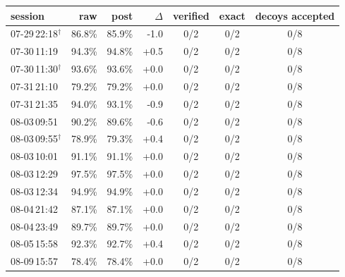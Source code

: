 \begin{tabular}{@{}lrrrccc@{}}
\toprule
session & raw & post & $\Delta$ & verified & exact & decoys accepted \\
\midrule
07-29\,22:18$^{\dagger}$ & 86.8\% & 85.9\% & -1.0 & 0/2 & 0/2 & 0/8 \\
07-30\,11:19 & 94.3\% & 94.8\% & +0.5 & 0/2 & 0/2 & 0/8 \\
07-30\,11:30$^{\dagger}$ & 93.6\% & 93.6\% & +0.0 & 0/2 & 0/2 & 0/8 \\
07-31\,21:10 & 79.2\% & 79.2\% & +0.0 & 0/2 & 0/2 & 0/8 \\
07-31\,21:35 & 94.0\% & 93.1\% & -0.9 & 0/2 & 0/2 & 0/8 \\
08-03\,09:51 & 90.2\% & 89.6\% & -0.6 & 0/2 & 0/2 & 0/8 \\
08-03\,09:55$^{\dagger}$ & 78.9\% & 79.3\% & +0.4 & 0/2 & 0/2 & 0/8 \\
08-03\,10:01 & 91.1\% & 91.1\% & +0.0 & 0/2 & 0/2 & 0/8 \\
08-03\,12:29 & 97.5\% & 97.5\% & +0.0 & 0/2 & 0/2 & 0/8 \\
08-03\,12:34 & 94.9\% & 94.9\% & +0.0 & 0/2 & 0/2 & 0/8 \\
08-04\,21:42 & 87.1\% & 87.1\% & +0.0 & 0/2 & 0/2 & 0/8 \\
08-04\,23:49 & 89.7\% & 89.7\% & +0.0 & 0/2 & 0/2 & 0/8 \\
08-05\,15:58 & 92.3\% & 92.7\% & +0.4 & 0/2 & 0/2 & 0/8 \\
08-09\,15:57 & 78.4\% & 78.4\% & +0.0 & 0/2 & 0/2 & 0/8 \\
\bottomrule
\end{tabular}
